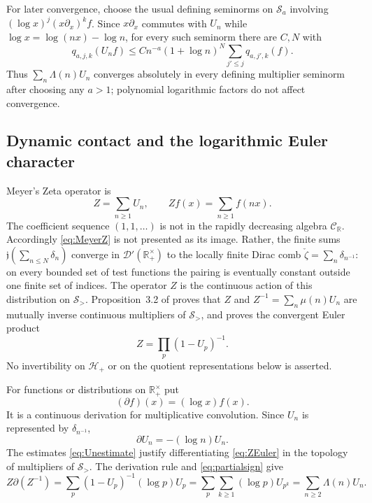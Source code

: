 \documentclass[11pt]{amsart}
\theoremstyle{definition}
\theoremstyle{remark}
\newcommand{\R}{\mathbb R}
\begin{document}
For later convergence, choose the usual defining seminorms on
$\mathcal S_a$ involving $(\log x)^j(x\partial_x)^kf$.  Since $x\partial_x$
commutes with $U_n$ while
$\log x=\log(nx)-\log n$, for every such seminorm there are $C,N$ with
\begin{equation}\label{eq:Unestimate}
 q_{a,j,k}(U_nf)\leq Cn^{-a}(1+\log n)^N
   \sum_{j'\leq j}q_{a,j',k}(f).
\end{equation}
Thus $\sum_n\Lambda(n)U_n$ converges absolutely in every defining
multiplier seminorm after choosing any $a>1$; polynomial logarithmic factors
do not affect convergence.

\subsection{Dynamic contact and the logarithmic Euler character}

Meyer's Zeta operator is
\begin{equation}\label{eq:MeyerZ}
 Z=\sum_{n\geq1}U_n,\qquad Zf(x)=\sum_{n\geq1}f(nx).
\end{equation}
The coefficient sequence $(1,1,\ldots)$ is not in the rapidly decreasing
algebra $\mathcal C_{\R}$.  Accordingly \eqref{eq:MeyerZ} is not presented
as its image.  Rather, the finite sums
$\mathfrak j(\sum_{n\leq N}\delta_n)$ converge in
$\mathcal D'(\R_+^\times)$ to the locally finite Dirac comb
$\check\zeta=\sum_n\delta_{n^{-1}}$: on every bounded set of test functions
the pairing is eventually constant outside one finite set of indices.
The operator $Z$ is the continuous action of this distribution on
$\mathcal S_>$.
Proposition~3.2 of \cite{MeyerZeta} proves that $Z$ and
$Z^{-1}=\sum_n\mu(n)U_n$ are mutually inverse continuous multipliers of
$\mathcal S_>$, and proves the convergent Euler product
\begin{equation}\label{eq:ZEuler}
 Z=\prod_p(1-U_p)^{-1}.
\end{equation}
No invertibility on $\mathcal H_+$ or on the quotient representations below
is asserted.

For functions or distributions on $\R_+^\times$ put
\begin{equation}\label{eq:partialconvention}
 (\partial f)(x)=(\log x)f(x).
\end{equation}
It is a continuous derivation for multiplicative convolution.  Since
$U_n$ is represented by $\delta_{n^{-1}}$,
\begin{equation}\label{eq:partialsign}
 \partial U_n=-(\log n)U_n.
\end{equation}
The estimates \eqref{eq:Unestimate} justify differentiating
\eqref{eq:ZEuler} in the topology of multipliers of $\mathcal S_>$.  The
derivation rule and \eqref{eq:partialsign} give
\begin{equation}\label{eq:contactEulercharacter}
 Z\partial(Z^{-1})
 =\sum_p(1-U_p)^{-1}(\log p)U_p
 =\sum_p\sum_{k\geq1}(\log p)U_{p^k}
 =\sum_{n\geq2}\Lambda(n)U_n.
\end{equation}
\end{document}
